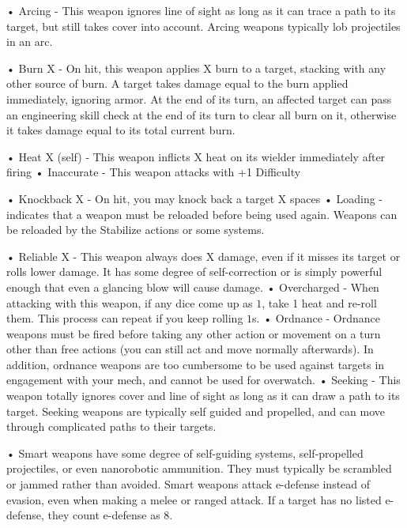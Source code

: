 •  \hypertarget{Arcing}{Arcing} - This weapon ignores line of sight as long as it can trace a path to its target, but still
  takes cover into account. Arcing weapons typically lob projectiles in an arc.

•  \hypertarget{Burn}{Burn X} - On hit, this weapon applies X burn to a target, stacking with any other source of burn.
  A target takes damage equal to the burn applied immediately, ignoring armor. At the end of its
  turn, an affected target can pass an engineering skill check at the end of its turn to clear all
  burn on it, otherwise it takes damage equal to its total current burn.





•  \hypertarget{HeatSelf}{Heat X (self)} - This weapon inflicts X heat on its wielder immediately after firing
•  \hypertarget{Inaccurate}{Inaccurate} - This weapon attacks with +1 Difficulty

•  \hypertarget{Knockback}{Knockback X} - On hit, you may knock back a target X spaces
•  \hypertarget{Loading}{Loading} - indicates that a weapon must be reloaded before being used again. Weapons can
  be reloaded by the Stabilize actions or some systems.

•  \hypertarget{Reliable}{Reliable X} - This weapon always does X damage, even if it misses its target or rolls lower
  damage. It has some degree of self-correction or is simply powerful enough that even a
  glancing blow will cause damage.
•  \hypertarget{Overcharged}{Overcharged} - When attacking with this weapon, if any dice come up as $1$, take 1 heat and
  re-roll them. This process can repeat if you keep rolling $1$s.
•  \hypertarget{Ordnance}{Ordnance} - Ordnance weapons must be fired before taking any other action or movement on a
  turn other than free actions (you can still act and move normally afterwards). In addition,
  ordnance weapons are too cumbersome to be used against targets in engagement with your
  mech, and cannot be used for overwatch.
•  \hypertarget{Seeking}{Seeking} - This weapon totally ignores cover and line of sight as long as it can draw a path to
  its target. Seeking weapons are typically self guided and propelled, and can move through
  complicated paths to their targets.

•  \hypertarget{Smart}{Smart} weapons have some degree of self-guiding systems, self-propelled projectiles, or even
  nanorobotic ammunition. They must typically be scrambled or jammed rather than avoided.
  Smart weapons attack e-defense instead of evasion, even when making a melee or ranged
  attack. If a target has no listed e-defense, they count e-defense as 8.

